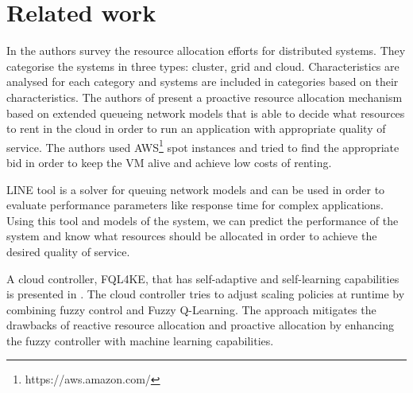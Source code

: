 \section{Related work}
\label{sec:relatedWork}

In \cite{Hussain2013} the authors survey the resource allocation efforts for distributed systems. They categorise the systems in three types: cluster, grid and cloud. Characteristics are analysed for each category and systems are included in categories based on their characteristics. The authors of \cite{Dubois} present a proactive resource allocation mechanism based on extended queueing network models that is able to decide what resources to rent in the cloud in order to run an application with appropriate quality of service. The authors used AWS\footnote{https://aws.amazon.com/} spot instances and tried to find the appropriate bid in order to keep the VM alive and achieve low costs of renting.

LINE \cite{Perez2013} tool is a solver for queuing network models and can be used in order to evaluate performance parameters like response time for complex applications. Using this tool and models of the system, we can predict the performance of the system and know what resources should be allocated in order to achieve the desired quality of service.

A cloud controller, FQL4KE, that has self-adaptive and self-learning capabilities is presented in \cite{Jamshidi2015}. The cloud controller tries to adjust scaling policies at runtime by combining fuzzy control and Fuzzy Q-Learning. The approach mitigates the drawbacks of reactive resource allocation and proactive allocation by enhancing the fuzzy controller with machine learning capabilities.
